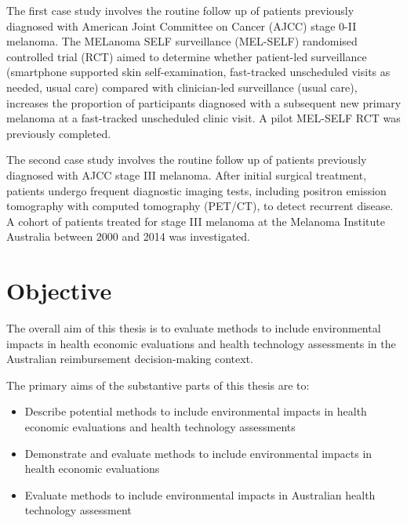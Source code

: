 \begin{refsection}
The first case study involves the routine follow up of patients previously diagnosed with American Joint Committee on Cancer (AJCC) stage 0-II melanoma. The MELanoma SELF surveillance (MEL-SELF) randomised controlled trial (RCT) aimed to determine whether patient-led surveillance (smartphone supported skin self-examination, fast-tracked unscheduled visits as needed, usual care) compared with clinician-led surveillance (usual care), increases the proportion of participants diagnosed with a subsequent new primary melanoma at a fast-tracked unscheduled clinic visit.\cite{ackermann_can_2021} A pilot MEL-SELF RCT was previously completed.\cite{ackermann_assessing_2022} 

The second case study involves the routine follow up of patients previously diagnosed with AJCC stage III melanoma. After initial surgical treatment, patients undergo frequent diagnostic imaging tests, including positron emission tomography with computed tomography (PET/CT), to detect recurrent disease. A cohort of patients treated for stage III melanoma at the Melanoma Institute Australia between 2000 and 2014 was investigated.

\section{Objective}
The overall aim of this thesis is to evaluate methods to include environmental impacts in health economic evaluations and health technology assessments in the Australian reimbursement decision-making context.

The primary aims of the substantive parts of this thesis are to:
\begin{itemize}
    \item Describe potential methods to include environmental impacts in health economic evaluations and health technology assessments
    \item Demonstrate and evaluate methods to include environmental impacts in health economic evaluations
    \item Evaluate methods to include environmental impacts in Australian health technology assessment
\end{itemize}

\printbibliography[heading=subbibliography]
\end{refsection}